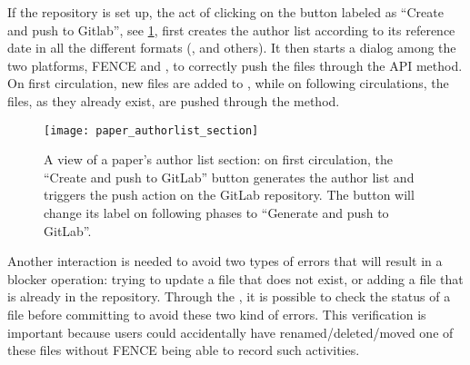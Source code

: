 If the repository is set up, the act of clicking on the button labeled as \enquote{Create and push to Gitlab}, see \cref{fig:paper_authorlist_section},
first creates the author list according to its reference date in all the different formats (,  and others).
It then starts a dialog among the two platforms, FENCE and \gitlab, to correctly push the files through the \gitlab API  method.
On first circulation, new files are added to \gitlab, while on following circulations, the files, as they already exist, are pushed through the  method.

\begin{figure}[htb]
  \centering
  \texttt{[image: paper\_authorlist\_section]}
  \caption{A view of a paper's author list section: on first circulation,
  the \enquote{Create and push to GitLab} button generates the author list and triggers the push action on the GitLab repository.
  The button will change its label on following phases to \enquote{Generate and push to GitLab}.}%
  \label{fig:paper_authorlist_section}
\end{figure}

Another interaction is needed to avoid two types of errors that will result in a blocker operation:
trying to update a file that does not exist, or adding a file that is already in the repository.
Through the , it is possible to check the status of a file before committing to avoid these two kind of errors.
This verification is important because users could accidentally have renamed/deleted/moved one of these files without FENCE being able to record such activities.
